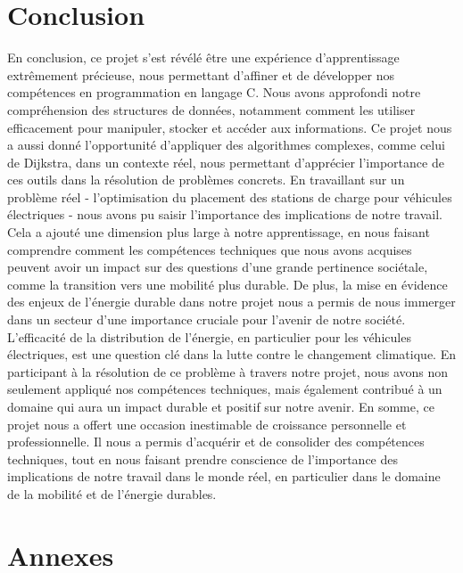 \documentclass[french,a4paper]{article}
\begin{document}
\section{Conclusion}

En conclusion, ce projet s'est révélé être une expérience d'apprentissage extrêmement précieuse, nous permettant d'affiner et de développer nos compétences en programmation en langage C. Nous avons approfondi notre compréhension des structures de données, notamment comment les utiliser efficacement pour manipuler, stocker et accéder aux informations. Ce projet nous a aussi donné l'opportunité d'appliquer des algorithmes complexes, comme celui de Dijkstra, dans un contexte réel, nous permettant d'apprécier l'importance de ces outils dans la résolution de problèmes concrets.
\newline
En travaillant sur un problème réel - l'optimisation du placement des stations de charge pour véhicules électriques - nous avons pu saisir l'importance des implications de notre travail. Cela a ajouté une dimension plus large à notre apprentissage, en nous faisant comprendre comment les compétences techniques que nous avons acquises peuvent avoir un impact sur des questions d'une grande pertinence sociétale, comme la transition vers une mobilité plus durable.
\newline
De plus, la mise en évidence des enjeux de l'énergie durable dans notre projet nous a permis de nous immerger dans un secteur d'une importance cruciale pour l'avenir de notre société. L'efficacité de la distribution de l'énergie, en particulier pour les véhicules électriques, est une question clé dans la lutte contre le changement climatique. En participant à la résolution de ce problème à travers notre projet, nous avons non seulement appliqué nos compétences techniques, mais également contribué à un domaine qui aura un impact durable et positif sur notre avenir.
\newline
En somme, ce projet nous a offert une occasion inestimable de croissance personnelle et professionnelle. Il nous a permis d'acquérir et de consolider des compétences techniques, tout en nous faisant prendre conscience de l'importance des implications de notre travail dans le monde réel, en particulier dans le domaine de la mobilité et de l'énergie durables.

\section{Annexes}





\end{document}
